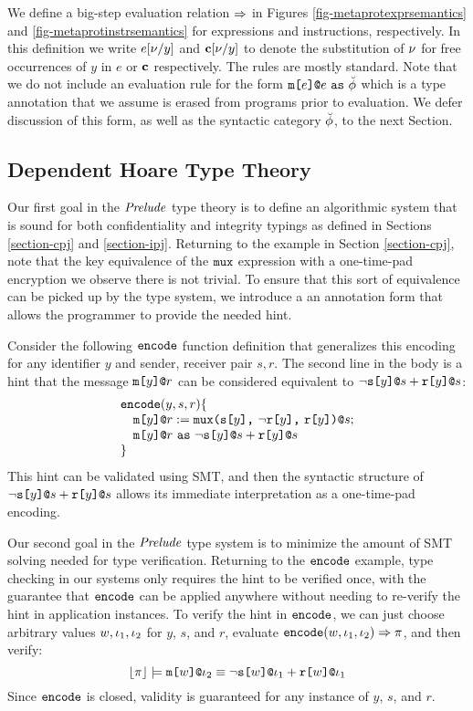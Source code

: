 \metaprotexprsemanticsfig

We define a big-step evaluation relation $\Rightarrow$ in Figures
\ref{fig-metaprotexprsemantics} and \ref{fig-metaprotinstrsemantics}
for expressions and instructions, respectively.  In this definition we
write $e[\nu/y]$ and $\mathbf{c}[\nu/y]$ to denote the substitution of
$\nu$ for free occurrences of $y$ in $e$ or $\mathbf{c}$ respectively. The
rules are mostly standard. Note that we do not include an evaluation
rule for the form $\texttt{m[}e\texttt{]}\texttt{@}e\ \texttt{as}\ \breve{\phi}$ which is a type
annotation that we assume is erased from programs prior to
evaluation. We defer discussion of this form, as well as the syntactic
category $\breve{\phi}$, to the next Section.

\metaprotinstrsemanticsfig

\subsection{Dependent Hoare Type Theory}

Our first goal in the $\mathit{Prelude}$ type theory is to define an
algorithmic system that is sound for both confidentiality and
integrity typings as defined in Sections \ref{section-cpj} and
\ref{section-ipj}. Returning to the example in Section
\ref{section-cpj}, note that the key equivalence of the $\texttt{mux}$
expression with a one-time-pad encryption we observe there
is not trivial. To ensure that this sort of equivalence
can be picked up by the type system, we introduce a
an annotation form that allows the programmer to provide
the needed hint.

Consider the following $\texttt{encode}$ function definition that
generalizes this encoding for any identifier $y$ and sender, receiver
pair $s,r$. The second line in the body is a hint that
the message $\texttt{m[}y\texttt{]}\texttt{@}r$ can be considered equivalent to
$\neg\texttt{s[}y\texttt{]}\texttt{@}s + \texttt{r[}y\texttt{]}\texttt{@}s$:
$$
\begin{array}{l}
\texttt{encode}(y,s,r) \{\\
\quad \texttt{m[}y\texttt{]}\texttt{@}r := \texttt{mux(} \texttt{s[}y\texttt{]} \texttt{,}\ \neg\texttt{r[}y\texttt{]} \texttt{,}\ \texttt{r[}y\texttt{]} \texttt{)}\texttt{@}s;\\
\quad \texttt{m[}y\texttt{]}\texttt{@}r\ \texttt{as}\ \neg\texttt{s[}y\texttt{]}\texttt{@}s + \texttt{r[}y\texttt{]}\texttt{@}s\\
\}
\end{array}
$$
This hint can be validated using SMT, and then the
syntactic structure of $\neg\texttt{s[}y\texttt{]}\texttt{@}s + \texttt{r[}y\texttt{]}\texttt{@}s$
allows its immediate interpretation as a one-time-pad encoding.

Our second goal in the $\mathit{Prelude}$ type system is to minimize the
amount of SMT solving needed for type verification.  Returning to the
$\texttt{encode}$ example, type checking in our systems only requires the
hint to be verified once, with the guarantee that $\texttt{encode}$ can
be applied anywhere without needing to re-verify the hint in
application instances. To verify the hint in $\texttt{encode}$, we can
just choose arbitrary values $w,\iota_1,\iota_2$ for $y$, $s$, and $r$,
evaluate $\texttt{encode}(w,\iota_1,\iota_2) \Rightarrow \pi$, and then verify:
$$\lfloor \pi \rfloor \models \texttt{m[}w\texttt{]}\texttt{@}\iota_2 \equiv
\neg\texttt{s[}w\texttt{]}\texttt{@}\iota_1 + \texttt{r[}w\texttt{]}\texttt{@}\iota_1$$ 
Since $\texttt{encode}$ is closed, validity is guaranteed for
any instance of $y$, $s$, and $r$.

